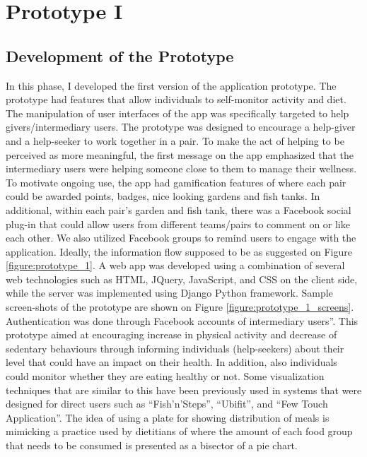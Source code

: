 
\chapter{Prototype I} %

\label{contextualenqchapter} %

\section{Development of the Prototype}
In this phase, I developed the first version of the application prototype. The prototype had features that allow individuals to self-monitor activity and diet.  The manipulation of user interfaces of the app was specifically targeted to help givers/intermediary users. The prototype was designed to encourage a help-giver and a help-seeker to work together in a pair. To make the act of helping to be perceived as more meaningful, the first message on the app emphasized that the intermediary users were helping someone close to them to manage their wellness.  To motivate ongoing use, the app had gamification features of where each pair could be awarded points, badges, nice looking gardens and fish tanks. In additional, within each pair's garden and fish tank, there was a Facebook social plug-in that could allow users from different teams/pairs to comment on or like each other. We also utilized Facebook groups to remind users to engage with the application. Ideally, the information flow supposed to be as suggested on Figure \ref{figure:prototype_1}. A web app was developed using a combination of several web technologies such as HTML, JQuery, JavaScript, and CSS on the client side, while the server was implemented using Django Python framework. Sample screen-shots of the prototype are shown on Figure \ref{figure:prototype_1_screens}. Authentication was done through Facebook accounts of intermediary users''. This prototype aimed at encouraging increase in physical activity and  decrease of sedentary behaviours through informing individuals (help-seekers) about their level that could have an impact on their health. In addition, also individuals could monitor whether they are eating healthy or not. Some visualization techniques that are similar to this have been previously used  in systems that were designed for direct users such as ``Fish'n'Steps''\citep{lin2006:fish}, ``Ubifit''\citep{klasnja2009:using},  and ``Few Touch Application''\citep{arsand:mobile}. The idea of using a plate for showing distribution of meals is mimicking a practice used by dietitians of where the amount of each food group that needs to be consumed is presented as a bisector of a pie chart. 
   

